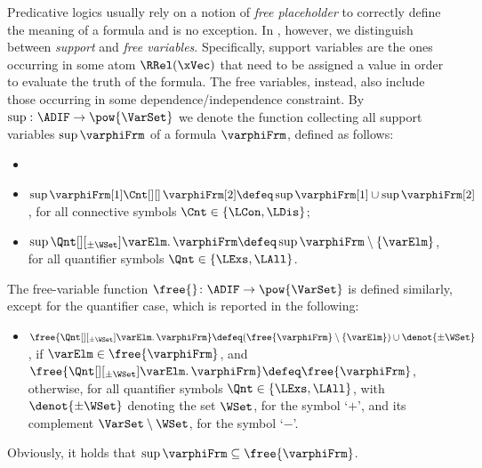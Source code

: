 \documentclass[authoryear]{elsarticle}
\begin{document}
Predicative logics usually rely on a notion of \emph{free placeholder} to
correctly define the meaning of a formula and \ADIF is no exception.
In \ADIF, however, we distinguish between \emph{support} and \emph{free
variables}.
Specifically, support variables are the ones occurring in some atom
$\RRel(\xVec)$ that need to be assigned a value in order to evaluate the truth
of the formula. The free variables, instead, also include those occurring in
some dependence/independence constraint.
%
By $\sup{} \colon \ADIF \to \pow{\VarSet}$ we denote the function collecting all
support variables $\sup{\varphiFrm}$ of a formula $\varphiFrm$, defined as
follows:
\begin{itemize}[$\bullet$]
\item
\item
  $\sup{\varphiFrm[1] \Cnt[][]\, \varphiFrm[2]} \defeq \sup{\varphiFrm[1]} \cup
  \sup{\varphiFrm[2]}$, for all connective symbols $\Cnt \in \{ \LCon, \LDis
  \}$;
\item
  $\sup{\Qnt[][_{\pm\WSet}] \varElm \ldotp \varphiFrm} \defeq \sup{\varphiFrm}
  \setminus \{ \varElm \}$, for all quantifier symbols $\Qnt \in \{ \LExs,
  \LAll \}$.
\end{itemize}
%
The free-variable function $\free{} \colon \ADIF \to \pow{\VarSet}$ is defined
similarly, except for the quantifier case, which is reported in the following:
\begin{itemize}[$\bullet$]
\item
  $\free{\Qnt[][_{\pm\WSet}] \varElm \ldotp \varphiFrm} \defeq
  (\free{\varphiFrm} \setminus \{ \varElm \}) \cup \denot{\pm\WSet}$, if
  $\varElm \in \free{\varphiFrm}$, and $\free{\Qnt[][_{\pm\WSet}] \varElm
  \ldotp \varphiFrm} \defeq \free{\varphiFrm}$, otherwise, for all quantifier
  symbols $\Qnt \in \{ \LExs, \LAll \}$, with $\denot{\pm\WSet}$ denoting the
  set $\WSet$, for the symbol `$+$', and its complement $\VarSet \setminus
  \WSet$, for the symbol `$-$'.
\end{itemize}
%
Obviously, it holds that $\sup{\varphiFrm} \subseteq \free{\varphiFrm}$.
\end{document}
